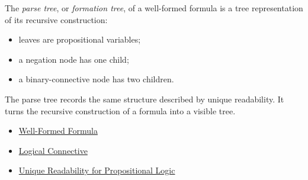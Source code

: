 \begin{tcolorbox}[colback=propbox, colframe=propborder, arc=2pt,
  left=6pt, right=6pt, top=4pt, bottom=4pt,
  title={\small\textbf{Definition (Parse Tree)}},
  fonttitle=\small\bfseries]
\label{def:parse-tree}
The \emph{parse tree}, or \emph{formation tree}, of a well-formed formula is a
tree representation of its recursive construction:
\begin{itemize}
  \item leaves are propositional variables;
  \item a negation node has one child;
  \item a binary-connective node has two children.
\end{itemize}
\end{tcolorbox}

\begin{remark*}[Interpretation]
The parse tree records the same structure described by unique readability. It
turns the recursive construction of a formula into a visible tree.
\end{remark*}

\begin{dependencies}
\begin{itemize}
  \item \hyperref[def:well-formed-formula]{Well-Formed Formula}
  \item \hyperref[def:logical-connective]{Logical Connective}
  \item \hyperref[thm:unique-readability-propositional-logic]{Unique Readability for Propositional Logic}
\end{itemize}
\end{dependencies}
